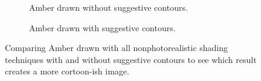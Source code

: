 \documentclass[10pt,twocolumn,letterpaper]{article}
\begin{document}
\begin{figure}
    \centering
    \begin{subfigure}{.48\linewidth}
        \caption{Amber drawn without suggestive contours.}
        \label{fig:amber-base}
    \end{subfigure}
    \hfill
    \begin{subfigure}{.48\linewidth}
        \caption{Amber drawn with suggestive contours.}
        \label{fig:amber-final}
    \end{subfigure}
    \caption{Comparing Amber drawn with all nonphotorealistic shading techniques with and without suggestive contours to see which result creates a more cortoon-ish image.}
    \label{fig:amber-compare}
\end{figure}
\end{document}
